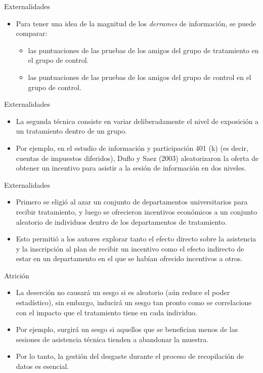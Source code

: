 \documentclass[11pt, aspectratio=169, compress]{beamer}
\begin{document}
\begin{frame}{Externalidades}
	\begin{itemize}
		\item Para tener una idea de la magnitud de los \textit{derrames} de información, se puede comparar:
		\begin{itemize}
			\item las puntuaciones de las pruebas de los amigos del grupo de tratamiento en el grupo de control.
			\item las puntuaciones de las pruebas de los amigos del grupo de control en el grupo de control.
		\end{itemize}
	\end{itemize}
\end{frame}
\begin{frame}{Externalidades}
	\begin{itemize}
		\item La segunda técnica consiste en variar deliberadamente el nivel de exposición a un tratamiento dentro de un grupo.
		
		\item Por ejemplo, en el estudio de información y participación 401 (k) (es decir, cuentas de impuestos diferidos), Duflo y Saez (2003) aleatorizaron la oferta de obtener un incentivo para asistir a la sesión de información en dos niveles.
	\end{itemize}
\end{frame}
\begin{frame}{Externalidades}
	\begin{itemize}
		\item Primero se eligió al azar un conjunto de departamentos universitarios para recibir tratamiento, y luego se ofrecieron incentivos económicos a un conjunto aleatorio de individuos dentro de los departamentos de tratamiento.
		
		\item Esto permitió a los autores explorar tanto el efecto directo sobre la asistencia y la inscripción al plan de recibir un incentivo como el efecto indirecto de estar en un departamento en el que se habían ofrecido incentivos a otros.
	\end{itemize}
\end{frame}
\begin{frame}{Atrición}
	\begin{itemize}
		\item La deserción no causará un sesgo si es aleatorio (aún reduce el poder estadístico), sin embargo, inducirá un sesgo tan pronto como se correlacione con el impacto que el tratamiento tiene en cada individuo.
		\item Por ejemplo, surgirá un sesgo si aquellos que se benefician menos de las sesiones de asistencia técnica tienden a abandonar la muestra. 
		\item Por lo tanto, la gestión del desgaste durante el proceso de recopilación de datos es esencial.
	\end{itemize}
\end{frame}
\end{document}
